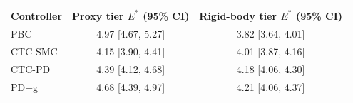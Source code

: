 \begin{tabular}{lcc}
\toprule
Controller & Proxy tier $E^{*}$ (95\% CI) & Rigid-body tier $E^{*}$ (95\% CI) \\
\midrule
PBC     & 4.97 [4.67, 5.27] & 3.82 [3.64, 4.01] \\
CTC-SMC & 4.15 [3.90, 4.41] & 4.01 [3.87, 4.16] \\
CTC-PD  & 4.39 [4.12, 4.68] & 4.18 [4.06, 4.30] \\
PD+g    & 4.68 [4.39, 4.97] & 4.21 [4.06, 4.37] \\
\bottomrule
\end{tabular}
